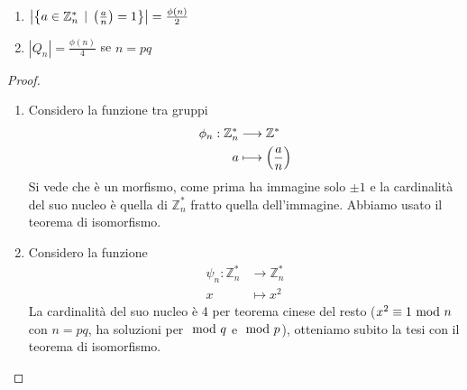 \begin{proposizione}\
	\begin{enumerate}
		\item $\left|\left\{a\in\mathbb{Z}_n^* \, \mid \, \left(\frac{a}{n}\right)=1\right\}\right|=\frac{\phi(n)}{2}$
		\item $\left|Q_n\right|=\frac{\phi(n)}{4}$ se $n=pq$ 
	\end{enumerate}
\end{proposizione}
\begin{proof}\
	\begin{enumerate}
		\item Considero la funzione tra gruppi
		\begin{align*}
		\phi_n:\mathbb{Z}_n^*&\longrightarrow\mathbb{Z}^*\\
		a&\longmapsto\left(\frac{a}{n}\right)
		\end{align*}
		Si vede che è un morfismo, come prima ha immagine solo $\pm1$ e la cardinalità del suo nucleo è quella di $\mathbb{Z}_n^*$ fratto quella dell'immagine. Abbiamo usato il teorema di isomorfismo.
		\item Considero la funzione 
		\begin{align*}
		\psi_n:\mathbb{Z}_n^*&\longrightarrow\mathbb{Z}_n^*\\
		x&\longmapsto x^2
		\end{align*}
		La cardinalità del suo nucleo è 4 per teorema cinese del resto ($x^2\equiv1 \ \mathrm{mod}\ n$ con $n=pq$, ha soluzioni per $\ \mathrm{mod}\ q$ e $\ \mathrm{mod}\ p$), otteniamo subito la tesi con il teorema di isomorfismo.
	\end{enumerate}
\end{proof}
